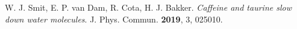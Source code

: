 
\noindent W. J. Smit, E. P. van Dam, R. Cota, H. J. Bakker. \textit{Caffeine and taurine slow down water molecules}. J. Phys. Commun. \textbf{2019}, 3, 025010.